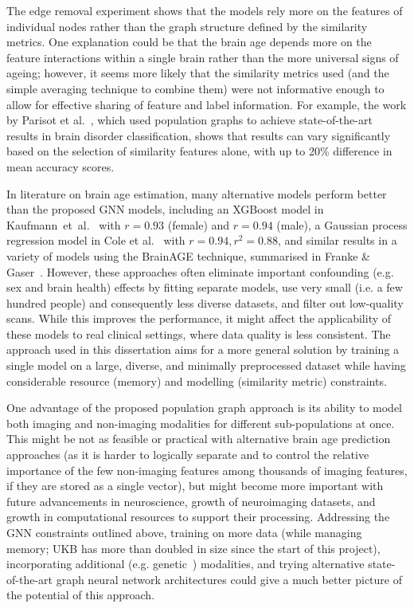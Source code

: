 The edge removal experiment shows that the models rely more on the features of individual nodes rather than the graph structure defined by the similarity metrics. One explanation could be that the brain age depends more on the feature interactions within a single brain rather than the more universal signs of ageing; however, it seems more likely that the similarity metrics used (and the simple averaging technique to combine them) were not informative enough to allow for effective sharing of feature and label information. For example, the work by Parisot et al.~\cite{parisot2018disease}, which used population graphs to achieve state-of-the-art results in brain disorder classification, shows that results can vary significantly based on the selection of similarity features alone, with up to 20\% difference in mean accuracy scores. 

In literature on brain age estimation, many alternative models perform better than the proposed GNN models, including an XGBoost model in Kaufmann~et~al.~\cite{kaufmann2019} with $r=0.93$ (female) and $r=0.94$ (male), a Gaussian process regression model in Cole et al.~\cite{cole2018brain} with $r=0.94, r^2=0.88$, and similar results in a variety of models using the BrainAGE technique, summarised in Franke \& Gaser~\cite{franke2019ten}. However, these approaches often eliminate important confounding (e.g. sex and brain health) effects by fitting separate models, use very small (i.e. a few hundred people) and consequently less diverse datasets, and filter out low-quality scans. While this improves the performance, it might affect the applicability of these models to real clinical settings, where data quality is less consistent. 
The approach used in this dissertation aims for a more general solution by training a single model on a large, diverse, and minimally preprocessed dataset while having considerable resource (memory) and modelling (similarity metric) constraints. 

One advantage of the proposed population graph approach is its ability to model both imaging and non-imaging modalities for different sub-populations at once. This might be not as feasible or practical with alternative brain age prediction approaches (as it is harder to logically separate and to control the relative importance of the few non-imaging features among thousands of imaging features, if they are stored as a single vector), but might become more important with future advancements in neuroscience, growth of neuroimaging datasets, and growth in computational resources to support their processing. Addressing the GNN constraints outlined above, training on more data (while managing memory; UKB has more than doubled in size since the start of this project), incorporating additional (e.g. genetic~\cite{parisot2018disease}) modalities, and trying alternative state-of-the-art graph neural network architectures could give a much better picture of the potential of this approach.
